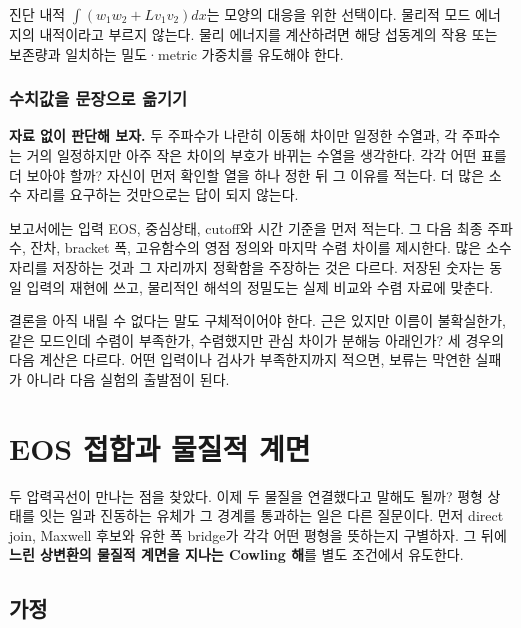 \documentclass[
  10pt,
  a4paper,
]{article}
\begin{document}
진단 내적 \(\int(w_1w_2+L v_1v_2)dx\)는 모양의 대응을 위한 선택이다.
물리적 모드 에너지의 내적이라고 부르지 않는다. 물리 에너지를 계산하려면
해당 섭동계의 작용 또는 보존량과 일치하는 밀도·metric 가중치를 유도해야
한다.

\subsubsection{수치값을 문장으로
옮기기}\label{uxc218uxce58uxac12uxc744-uxbb38uxc7a5uxc73cuxb85c-uxc62euxae30uxae30}

\textbf{자료 없이 판단해 보자.} 두 주파수가 나란히 이동해 차이만 일정한
수열과, 각 주파수는 거의 일정하지만 아주 작은 차이의 부호가 바뀌는
수열을 생각한다. 각각 어떤 표를 더 보아야 할까? 자신이 먼저 확인할 열을
하나 정한 뒤 그 이유를 적는다. 더 많은 소수 자리를 요구하는 것만으로는
답이 되지 않는다.

보고서에는 입력 EOS, 중심상태, cutoff와 시간 기준을 먼저 적는다. 그 다음
최종 주파수, 잔차, bracket 폭, 고유함수의 영점 정의와 마지막 수렴 차이를
제시한다. 많은 소수 자리를 저장하는 것과 그 자리까지 정확함을 주장하는
것은 다르다. 저장된 숫자는 동일 입력의 재현에 쓰고, 물리적인 해석의
정밀도는 실제 비교와 수렴 자료에 맞춘다.

결론을 아직 내릴 수 없다는 말도 구체적이어야 한다. 근은 있지만 이름이
불확실한가, 같은 모드인데 수렴이 부족한가, 수렴했지만 관심 차이가 분해능
아래인가? 세 경우의 다음 계산은 다르다. 어떤 입력이나 검사가
부족한지까지 적으면, 보류는 막연한 실패가 아니라 다음 실험의 출발점이
된다.


\section{EOS 접합과 물질적
계면}\label{eos-uxc811uxd569uxacfc-uxbb3cuxc9c8uxc801-uxacc4uxba74}

두 압력곡선이 만나는 점을 찾았다. 이제 두 물질을 연결했다고 말해도 될까?
평형 상태를 잇는 일과 진동하는 유체가 그 경계를 통과하는 일은 다른
질문이다. 먼저 direct join, Maxwell 후보와 유한 폭 bridge가 각각 어떤
평형을 뜻하는지 구별하자. 그 뒤에 \textbf{느린 상변환의 물질적 계면을
지나는 Cowling 해}를 별도 조건에서 유도한다.

\subsection{가정}\label{uxac00uxc815-1}
\end{document}
